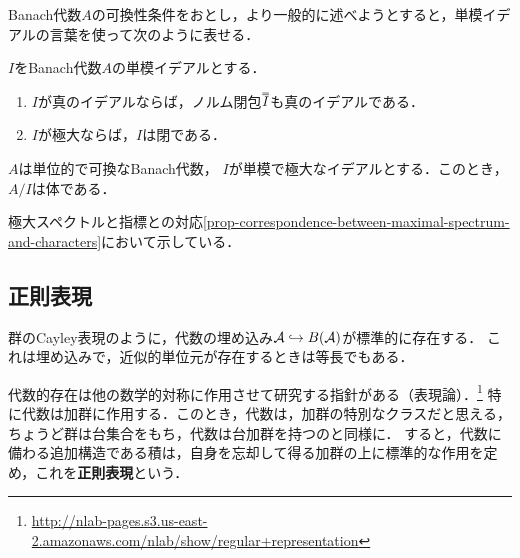 \documentclass[uplatex,dvipdfmx]{jsreport}
\begin{document}
Banach代数$A$の可換性条件をおとし，より一般的に述べようとすると，単模イデアルの言葉を使って次のように表せる．

\begin{theorem}
    $I$をBanach代数$A$の単模イデアルとする．
    \begin{enumerate}
        \item $I$が真のイデアルならば，ノルム閉包$\oo{I}$も真のイデアルである．
        \item $I$が極大ならば，$I$は閉である．
    \end{enumerate}
\end{theorem}

\begin{lemma}
    $A$は単位的で可換なBanach代数，
    $I$が単模で極大なイデアルとする．このとき，$A/I$は体である．
\end{lemma}
\begin{Proof}
    極大スペクトルと指標との対応\ref{prop-correspondence-between-maximal-spectrum-and-characters}において示している．
\end{Proof}

\subsection{正則表現}

\begin{tcolorbox}[colframe=ForestGreen, colback=ForestGreen!10!white,breakable,colbacktitle=ForestGreen!40!white,coltitle=black,fonttitle=\bfseries\sffamily,
title=]
    群のCayley表現のように，代数の埋め込み$\mathcal{A}\hookrightarrow B(\mathcal{A})$が標準的に存在する．
    これは埋め込みで，近似的単位元が存在するときは等長でもある．

    代数的存在は他の数学的対称に作用させて研究する指針がある（表現論）．\footnote{\url{http://nlab-pages.s3.us-east-2.amazonaws.com/nlab/show/regular+representation}}
    特に代数は加群に作用する．このとき，代数は，加群の特別なクラスだと思える，ちょうど群は台集合をもち，代数は台加群を持つのと同様に．
    すると，代数に備わる追加構造である積は，自身を忘却して得る加群の上に標準的な作用を定め，これを\textbf{正則表現}という．
\end{tcolorbox}
\end{document}
